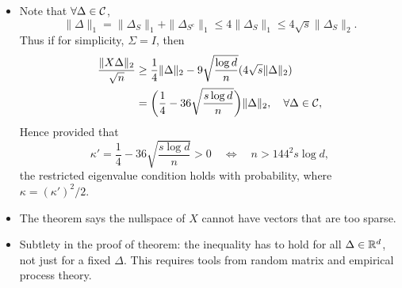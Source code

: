 \begin{rmk} \leavevmode
\begin{itemize}
    \item Note that $\forall \Delta\in\mathcal{C}$,
        \begin{equation}
            \|\Delta\|_1=\|\Delta_S\|_1+\|\Delta_{S^c}\|_1\le4\|\Delta_S\|_1\le4\sqrt{s}\|\Delta_S\|_2.
        \end{equation}
        Thus if for simplicity, $\Sigma=I$, then
        \begin{equation}
        \begin{split}
            \frac{\|X\Delta\|_2}{\sqrt{n}}
                & \ge\frac{1}{4}\|\Delta\|_2-9\sqrt{\frac{\log d}{n}}(4\sqrt{s}\|\Delta\|_2)    \\
                & =\bigg(\frac{1}{4}-36\sqrt{\frac{s\log d}{n}}\bigg)\|\Delta\|_2, \quad \forall\Delta\in\mathcal{C},
        \end{split}
        \end{equation}
        Hence provided that
        \begin{equation}
            \kappa'=\frac{1}{4}-36\sqrt{\frac{s\log d}{n}}>0\quad\Leftrightarrow\quad n>144^2 s\log d,
        \end{equation}
        the restricted eigenvalue condition holds with probability,
        where $\kappa=(\kappa')^2/2$.
    \item The theorem says the nullspace of $X$ cannot have vectors that are too sparse.
    \item Subtlety in the proof of theorem:
        the inequality has to hold for all $\Delta\in{\mathbb{R}}^d$,
        not just for a fixed $\Delta$.
        This requires tools from random matrix and empirical process theory.
\end{itemize}
\end{rmk}
